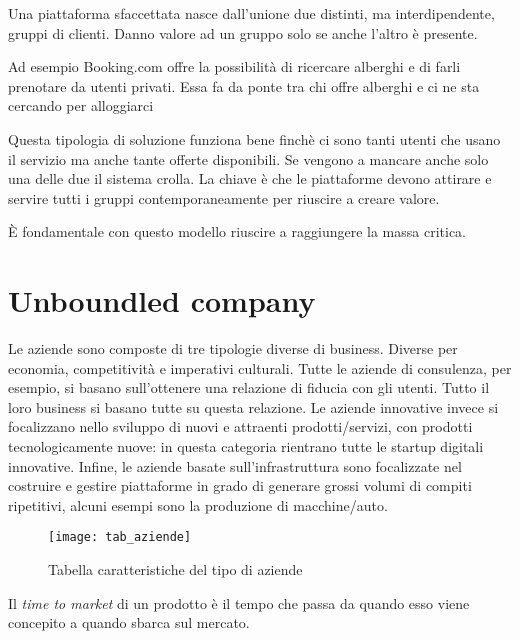 Una piattaforma sfaccettata nasce dall'unione due distinti, ma interdipendente,
gruppi di clienti. Danno valore ad un gruppo solo se anche l'altro è presente.

\begin{example}
Ad esempio Booking.com offre la possibilità di ricercare alberghi e di farli
prenotare da utenti privati. Essa fa da ponte tra chi offre alberghi e ci ne
sta cercando per alloggiarci
\end{example}

Questa tipologia di soluzione funziona bene finchè ci sono tanti utenti che
usano il servizio ma anche tante offerte disponibili. Se vengono a mancare
anche solo una delle due il sistema crolla. La chiave è che le piattaforme
devono attirare e servire tutti i gruppi contemporaneamente per riuscire a
creare valore.

\begin{example}[Pubblicità]
\end{example}

È fondamentale con questo modello riuscire a raggiungere la massa critica.

\chapter{Unboundled company}

Le aziende sono composte di tre tipologie diverse di business. Diverse per
economia, competitività e imperativi culturali.
Tutte le aziende di consulenza, per esempio, si basano sull'ottenere una
relazione di fiducia con gli utenti. Tutto il loro business si basano tutte su
questa relazione. Le aziende innovative invece si focalizzano nello sviluppo di
nuovi e attraenti prodotti/servizi, con prodotti tecnologicamente nuove: in
questa categoria rientrano tutte le startup digitali innovative. Infine, le
aziende basate sull'infrastruttura sono focalizzate nel costruire e gestire
piattaforme in grado di generare grossi volumi di compiti ripetitivi, alcuni
esempi sono la produzione di macchine/auto.

\begin{figure}[t]
 \centering
 \texttt{[image: tab\_aziende]}
 \caption{Tabella caratteristiche del tipo di aziende}
 \label{fig:bmi:tab_aziende}
\end{figure}

\begin{definition}
Il \textit{time to market} di un prodotto è il tempo che passa da quando esso
viene concepito a quando sbarca sul mercato.
\end{definition}

